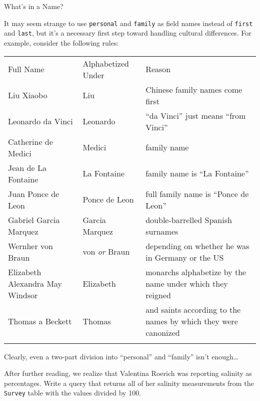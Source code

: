 \documentclass{book}
\begin{document}
\begin{swcbox}{What's in a Name?}

It may seem strange to use \texttt{personal} and \texttt{family} as
field names instead of \texttt{first} and \texttt{last}, but it's a
necessary first step toward handling cultural differences. For example,
consider the following rules:

\begin{tabular}{lll}
\hline\noalign{\medskip}
Full Name & Alphabetized Under & Reason
\\\noalign{\medskip}
\hline\noalign{\medskip}
Liu Xiaobo & Liu & Chinese family names come first
\\\noalign{\medskip}
Leonardo da Vinci & Leonardo & ``da Vinci'' just means ``from Vinci''
\\\noalign{\medskip}
Catherine de Medici & Medici & family name
\\\noalign{\medskip}
Jean de La Fontaine & La Fontaine & family name is ``La Fontaine''
\\\noalign{\medskip}
Juan Ponce de Leon & Ponce de Leon & full family name is ``Ponce de
Leon''
\\\noalign{\medskip}
Gabriel Garcia Marquez & Garcia Marquez & double-barrelled Spanish
surnames
\\\noalign{\medskip}
Wernher von Braun & von \emph{or} Braun & depending on whether he was in
Germany or the US
\\\noalign{\medskip}
Elizabeth Alexandra May Windsor & Elizabeth & monarchs alphabetize by
the name under which they reigned
\\\noalign{\medskip}
Thomas a Beckett & Thomas & and saints according to the names by which
they were canonized
\\\noalign{\medskip}
\hline
\end{tabular}

Clearly, even a two-part division into ``personal'' and ``family'' isn't
enough\ldots{}

\end{swcbox}

\begin{challenge}
  After further reading, we realize that Valentina Roerich was reporting
  salinity as percentages. Write a query that returns all of her
  salinity measurements from the \texttt{Survey} table with the values
  divided by 100.
\end{challenge}
\end{document}
